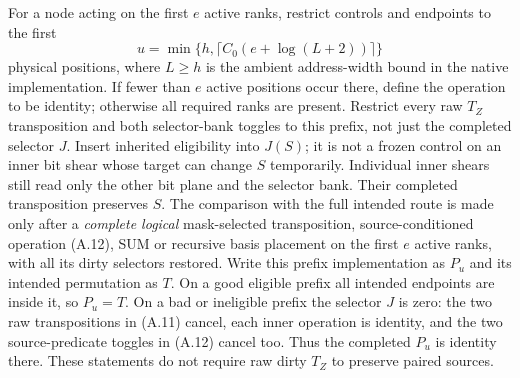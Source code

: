 For a node acting on the first $e$ active ranks, restrict controls and
endpoints to the first
\[
 u=\min\{h,\lceil C_0(e+\log(L+2))\rceil\}
\]
physical positions, where $L\ge h$ is the ambient address-width bound
in the native implementation. If fewer than $e$ active positions occur there,
define the operation to be identity; otherwise all required ranks are
present. Restrict every raw $T_Z$ transposition and both selector-bank
toggles to this prefix, not just the completed selector $J$. Insert
inherited eligibility into $J(S)$; it is not a frozen control on an
inner bit shear whose target can change $S$ temporarily. Individual
inner shears still read only the other bit plane and the selector bank.
Their completed transposition preserves $S$. The comparison with the
full intended route is made only after a \emph{complete logical}
mask-selected transposition, source-conditioned operation (A.12), SUM
or recursive basis placement on the first $e$ active ranks, with all
its dirty selectors restored. Write this
prefix implementation as $P_u$ and its intended permutation as $T$.
On a good eligible prefix all intended endpoints are inside it, so
$P_u=T$. On a bad or ineligible prefix the selector $J$ is zero:
the two raw transpositions in (A.11) cancel, each inner operation is
identity, and the two source-predicate toggles in (A.12) cancel too.
Thus the completed $P_u$ is identity there. These statements do not
require raw dirty $T_Z$ to preserve paired sources.


